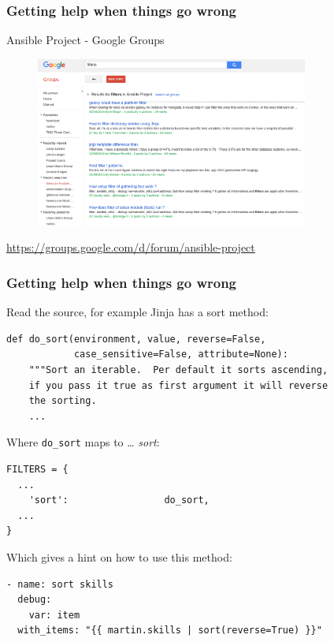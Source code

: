 \documentclass[pdf]{beamer}
\begin{document}

\begin{frame}[fragile]
  \frametitle{Getting help when things go wrong}
  Ansible Project - Google Groups
  \begin{center}
    \begin{figure}
      \includegraphics[width=0.8\textwidth]{ansible-google-group.png}
    \end{figure}
  \end{center}
  \tiny \url{https://groups.google.com/d/forum/ansible-project}
\end{frame}

\begin{frame}[t,fragile]
  \frametitle{Getting help when things go wrong}
  Read the source, for example Jinja has a sort method:
  \begin{lstlisting}[title=\tiny\url{https://github.com/pallets/jinja/blob/master/jinja2/filters.py}, captionpos=b]
def do_sort(environment, value, reverse=False,
            case_sensitive=False, attribute=None):
    """Sort an iterable.  Per default it sorts ascending,
    if you pass it true as first argument it will reverse
    the sorting.
    ...
  \end{lstlisting}
  \pause{}
  Where \texttt{do\_sort} maps to \ldots \pause{} \textit{sort}:
  \begin{lstlisting}
FILTERS = {
  ...
    'sort':                 do_sort,
  ...
}
  \end{lstlisting}
  \pause{}
  Which gives a hint on how to use this method:
  \begin{lstlisting}
- name: sort skills
  debug:
    var: item
  with_items: "{{ martin.skills | sort(reverse=True) }}"
  \end{lstlisting}
\end{frame}
\end{document}
